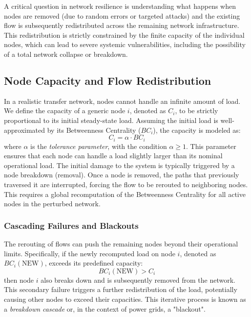 A critical question in network resilience is understanding what happens when nodes are removed (due to random errors or targeted attacks) and the existing flow is subsequently redistributed across the remaining network infrastructure. This redistribution is strictly constrained by the finite capacity of the individual nodes, which can lead to severe systemic vulnerabilities, including the possibility of a total network collapse or breakdown.

\subsection{Node Capacity and Flow Redistribution}
\label{subsubsec:capacity_redistribution}

In a realistic transfer network, nodes cannot handle an infinite amount of load. We define the capacity of a generic node \(i\), denoted as \(C_i\), to be strictly proportional to its initial steady-state load. Assuming the initial load is well-approximated by its Betweenness Centrality (\(BC_i\)), the capacity is modeled as:
\[
    C_i = \alpha \cdot BC_i
\]
where \(\alpha\) is the \textit{tolerance parameter}, with the condition \(\alpha \geq 1\). This parameter ensures that each node can handle a load slightly larger than its nominal operational load. The initial damage to the system is typically triggered by a node breakdown (removal). Once a node is removed, the paths that previously traversed it are interrupted, forcing the flow to be rerouted to neighboring nodes. This requires a global recomputation of the Betweenness Centrality for all active nodes in the perturbed network.

\subsubsection{Cascading Failures and Blackouts}
\label{subsubsec:cascading_failures}

The rerouting of flows can push the remaining nodes beyond their operational limits. Specifically, if the newly recomputed load on node \(i\), denoted as \(BC_i(\text{NEW})\), exceeds its predefined capacity:
\[
    BC_i(\text{NEW}) > C_i
\]
then node \(i\) also breaks down and is subsequently removed from the network. This secondary failure triggers a further redistribution of the load, potentially causing other nodes to exceed their capacities. This iterative process is known as a \textit{breakdown cascade} or, in the context of power grids, a "blackout".

